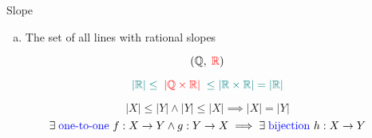 %
%

\begin{frame}{}
  \begin{exampleblock}{Slope}
    \begin{enumerate}[(a)]
      \item The set of all lines with rational slopes
    \end{enumerate}
  \end{exampleblock}

  \pause
  \[
    (\mathbb{Q}, \;\textcolor{red}{\mathbb{R}})
  \]

  \pause
  \[
    \textcolor{teal}{|\mathbb{R}| \le \;\textcolor{red}{|\mathbb{Q} \times \mathbb{R}|}\; \le |\mathbb{R} \times \mathbb{R}| = |\mathbb{R}|}
  \]
\end{frame}

\begin{frame}{}
  \begin{center}
    {\large {}}
  \end{center}

  \pause
  \vspace{0.30cm}
  \begin{theorem}
    \[
      |X| \le |Y| \land |Y| \le |X| \implies |X| = |Y|
    \]
    \pause
    \[
      \exists\; \text{\textcolor{blue}{one-to-one} } f: X \to Y \land g: Y \to X \implies \exists\; \text{\textcolor{blue}{bijection} } h: X \to Y
    \]
  \end{theorem}

  \pause
  \begin{columns}
      \pause
      \pause
      \vspace{-0.60cm}
      \begin{center}
	{}
      \end{center}
  \end{columns}
\end{frame}

